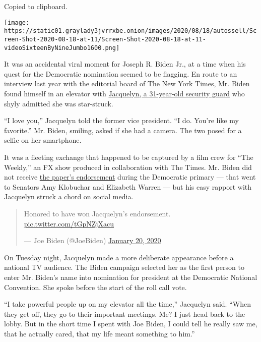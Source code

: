 Copied to clipboard.

\texttt{[image: https://static01.graylady3jvrrxbe.onion/images/2020/08/18/autossell/Screen-Shot-2020-08-18-at-11/Screen-Shot-2020-08-18-at-11-videoSixteenByNineJumbo1600.png]}

It was an accidental viral moment for Joseph R. Biden Jr., at a time
when his quest for the Democratic nomination seemed to be flagging. En
route to an interview last year with the editorial board of The New York
Times, Mr. Biden found himself in an elevator with
\href{https://www.nytimes3xbfgragh.onion/2020/08/18/us/politics/nyt-security-guard-joe-biden-nomination.html}{Jacquelyn,
a 31-year-old security guard} who shyly admitted she was star-struck.

``I love you,'' Jacquelyn told the former vice president. ``I do. You're
like my favorite.'' Mr. Biden, smiling, asked if she had a camera. The
two posed for a selfie on her smartphone.

It was a fleeting exchange that happened to be captured by a film crew
for ``The Weekly,'' an FX show produced in collaboration with The Times.
Mr. Biden did not receive
\href{https://www.nytimes3xbfgragh.onion/2020/01/19/us/politics/amy-klobuchar-elizabeth-warren-new-york-times-endorsement.html}{the
paper's endorsement} during the Democratic primary --- that went to
Senators Amy Klobuchar and Elizabeth Warren --- but his easy rapport
with Jacquelyn struck a chord on social media.

\begin{quote}
Honored to have won Jacquelyn's endorsement.
\href{https://t.co/tGpNZjXacu}{pic.twitter.com/tGpNZjXacu}

--- Joe Biden (@JoeBiden)
\href{https://twitter.com/JoeBiden/status/1219350885521858562?ref_src=twsrc\%5Etfw}{January
20, 2020}
\end{quote}

On Tuesday night, Jacquelyn made a more deliberate appearance before a
national TV audience. The Biden campaign selected her as the first
person to enter Mr. Biden's name into nomination for president at the
Democratic National Convention. She spoke before the start of the roll
call vote.

``I take powerful people up on my elevator all the time,'' Jacquelyn
said. ``When they get off, they go to their important meetings. Me? I
just head back to the lobby. But in the short time I spent with Joe
Biden, I could tell he really saw me, that he actually cared, that my
life meant something to him.''

